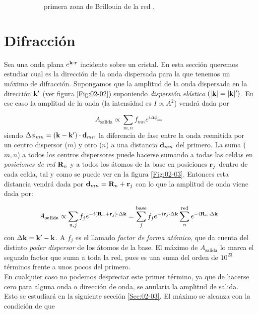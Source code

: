 \begin{figure}[h!]
\begin{subfigure}{0.45\linewidth}
	\caption{primera zona de Brillouin de la red \fcc.}
	\end{subfigure}
	\caption{}
\end{figure}

\section{Difracción}

Sea una onda plana $e^{\mathbf{k} \cdot \mathbf{r}}$ incidente sobre un cristal. En esta sección queremos estudiar cual es la dirección de la onda dispersada para la que tenemos un máximo de difracción. Supongamos que la amplitud de la onda dispersada en la dirección $\mathbf{k}'$ (ver figura \ref{Fig:02-02}) suponiendo \textit{dispersión elástica} $(|\mathbf{k}|=|\mathbf{k}|')$. En ese caso la amplitud de la onda (la intensidad es $I\propto A^2$) vendrá dada por 

\begin{equation}
    A_{\text{salida}} \propto \sum_{m,n} f_{mn} e^{i \Delta \phi_{mn}}
\end{equation}
siendo $\Delta \phi_{mn} = (\mathbf{k} - \mathbf{k}') \cdot \mathbf{d}_{mn}$ la diferencia de fase entre la onda reemitida por un centro dispersor ($m$) y otro ($n$) a una distancia $\mathbf{d}_{mn}$ del primero. La suma ($m,n$) a todos los centros dispersores puede hacerse sumando a todas las celdas en \textit{posiciones de red} $\mathbf{R}_n$ y a todos los átomos de la base en posiciones $\mathbf{r}_j$ dentro de cada celda, tal y como se puede ver en la figura \ref{Fig:02-03}. Entonces esta distancia vendrá dada por $\mathbf{d}_{mn}=\mathbf{R}_n+\mathbf{r}_j$ con lo que la amplitud de onda viene dada por:

\begin{equation}
    A_{\text{salida}} \propto  \sum_{n,j} f_j e^{-i (\mathbf{R}_n + \mathbf{r}_j) \cdot \Delta \mathbf{k}} = \sum_j^{\text{base}} f_j e^{-i \mathbf{r}_j \cdot \Delta \mathbf{k}} \sum_{n}^{\text{red}} e^{-i\mathbf{R}_n \cdot \Delta \mathbf{k}} \label{Ec:02-02-02}
\end{equation}
con $\Delta \mathbf{k} = \mathbf{k}' - \mathbf{k}$. A $f_j$ es el llamado \textit{factor de forma atómico}, que da cuenta del distinto \textit{poder dispersor} de los átomos de la base. El máximo de $A_{\text{salida}}$ lo marca el segundo factor que suma a toda la red, pues es una suma del orden de $10^{23}$ términos frente a unos pocos del primero. \\

En cualquier caso no podemos despreciar este primer término, ya que de hacerse cero para alguna onda o dirección de onda, se anularía la amplitud de salida. Esto se estudiará en la siguiente sección \ref{Sec:02-03}. El máximo se alcanza con la condición de que

